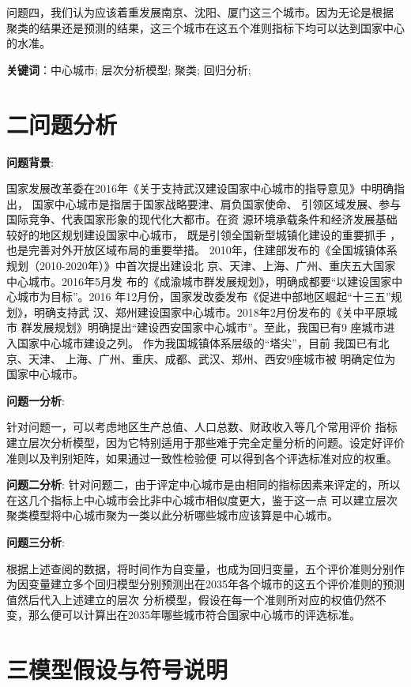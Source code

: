 \documentclass[openany,oneside]{ctexbook}
\begin{document}
问题四，我们认为应该着重发展南京、沈阳、厦门这三个城市。因为无论是根据
聚类的结果还是预测的结果，这三个城市在这五个准则指标下均可以达到国家中心的水准。

{\bfseries 关键词}：中心城市; 层次分析模型; 聚类; 回归分析;

\chapter{\sihao\hei 二\quad 问题分析}
{\bfseries 问题背景}:

国家发展改革委在2016年《关于支持武汉建设国家中心城市的指导意见》中明确指出，
国家中心城市是指居于国家战略要津、肩负国家使命、
引领区域发展、参与国际竞争、代表国家形象的现代化大都市。在资
源环境承载条件和经济发展基础较好的地区规划建设国家中心城市，
既是引领全国新型城镇化建设的重要抓手
，也是完善对外开放区域布局的重要举措。
2010年，住建部发布的《全国城镇体系规划（2010-2020年）》中首次提出建设北
京、天津、上海、广州、重庆五大国家中心城市。2016年5月发
布的《成渝城市群发展规划》，明确成都要“以建设国家中心城市为目标”。2016
年12月份，国家发改委发布《促进中部地区崛起“十三五”规划》，明确支持武
汉、郑州建设国家中心城市。2018年2月份发布的《关中平原城市
群发展规划》明确提出“建设西安国家中心城市”。至此，我国已有9
座城市进入国家中心城市建设之列。
作为我国城镇体系层级的“塔尖”，目前
我国已有北京、天津、
上海、广州、重庆、成都、武汉、郑州、西安9座城市被
明确定位为国家中心城市。



{\bfseries 问题一分析}:

针对问题一，可以考虑地区生产总值、人口总数、财政收入等几个常用评价
指标建立层次分析模型，因为它特别适用于那些难于完全定量分析的问题。设定好评价准则以及判别矩阵，如果通过一致性检验便
可以得到各个评选标准对应的权重。

{\bfseries 问题二分析}:
针对问题二，由于评定中心城市是由相同的指标因素来评定的，所以在这几个指标上中心城市会比非中心城市相似度更大，鉴于这一点
可以建立层次聚类模型将中心城市聚为一类以此分析哪些城市应该算是中心城市。


{\bfseries 问题三分析}:

根据上述查阅的数据，将时间作为自变量，也成为回归变量，五个评价准则分别作
为因变量建立多个回归模型分别预测出在2035年各个城市的这五个评价准则的预测值然后代入上述建立的层次
分析模型，假设在每一个准则所对应的权值仍然不变，那么便可以计算出在2035年哪些城市符合国家中心城市的评选标准。

\chapter{\sihao\hei 三\quad 模型假设与符号说明}
\end{document}
